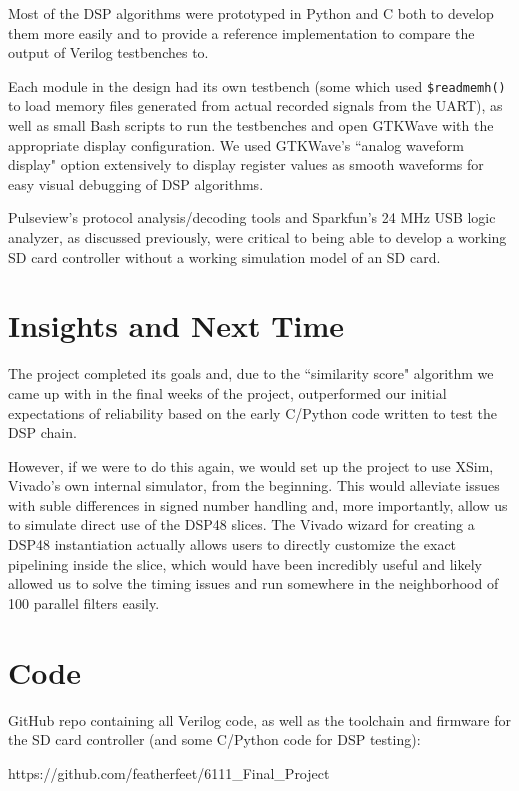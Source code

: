 \documentclass[conference]{IEEEtran}
\begin{document}
Most of the DSP algorithms were prototyped in Python and C both to develop them more easily and to provide a reference implementation to compare the output of Verilog testbenches to.

Each module in the design had its own testbench (some which used \lstinline{$readmemh()} to load memory files generated from actual recorded signals from the UART), as well as small Bash scripts to run the testbenches and open GTKWave with the appropriate display configuration. We used GTKWave's ``analog waveform display" option extensively to display register values as smooth waveforms for easy visual debugging of DSP algorithms.

Pulseview's protocol analysis/decoding tools and Sparkfun's 24 MHz USB logic analyzer, as discussed previously, were critical to being able to develop a working SD card controller without a working simulation model of an SD card.

\section{Insights and Next Time}

The project completed its goals and, due to the ``similarity score" algorithm we came up with in the final weeks of the project, outperformed our initial expectations of reliability based on the early C/Python code written to test the DSP chain.

However, if we were to do this again, we would set up the project to use XSim, Vivado's own internal simulator, from the beginning. This would alleviate issues with suble differences in signed number handling and, more importantly, allow us to simulate direct use of the DSP48 slices. The Vivado wizard for creating a DSP48 instantiation actually allows users to directly customize the exact pipelining inside the slice, which would have been incredibly useful and likely allowed us to solve the timing issues and run somewhere in the neighborhood of 100 parallel filters easily.

\section{Code}

GitHub repo containing all Verilog code, as well as the toolchain and firmware for the SD card controller (and some C/Python code for DSP testing):

https://github.com/featherfeet/6111\_Final\_Project
\end{document}
